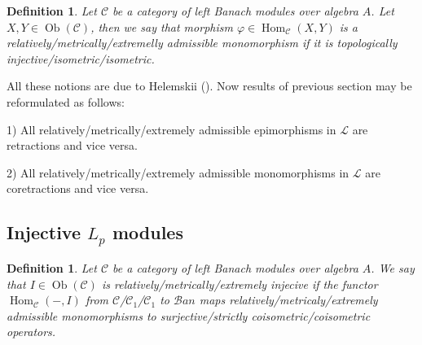 \documentclass[12pt]{article}
\newtheorem{definition}[theorem]{Definition}
\begin{document}
\begin{definition}\label{AdmMonoMorph} Let $\mathscr{C}$ be a category of left Banach modules over algebra $A$. Let $X,Y\in\operatorname{Ob}(\mathscr{C})$, then we say that morphism $\varphi\in\operatorname{Hom}_{\mathscr{C}}(X,Y)$ is a relatively/metrically/extremelly admissible monomorphism if it is topologically injective/isometric/isometric.
\end{definition}


All these notions are due to Helemskii (\cite{HelMetFrPoj}). Now results of previous section may be reformulated as follows:

1) All relatively/metrically/extremely admissible epimorphisms in $\mathscr{L}$ are retractions and vice versa.

2) All relatively/metrically/extremely admissible monomorphisms in $\mathscr{L}$ are coretractions and vice versa.


















\subsection{Injective \texorpdfstring{$L_p$}{Lp} modules}

\begin{definition} Let $\mathscr{C}$ be a category of left Banach modules over algebra $A$. We say that $I\in\operatorname{Ob}(\mathscr{C})$ is relatively/metrically/extremely injecive if the functor $\operatorname{Hom}_{\mathscr{C}}(-,I)$ from $\mathscr{C}$/$\mathscr{C}_1$/$\mathscr{C}_1$ to $\mathscr{B}an$ maps relatively/metricaly/extremely admissible monomorphisms to surjective/strictly coisometric/coisometric operators.
\end{definition}
\end{document}
